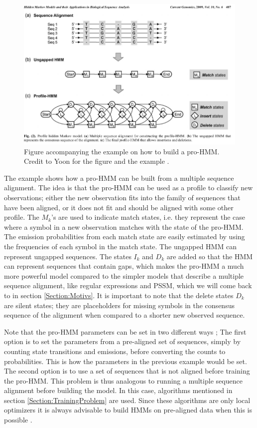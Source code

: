 \documentclass{article}\usepackage[]{graphicx}\usepackage[]{color}
\begin{document}
\begin{figure}[h]
    \centering
    \includegraphics[width = \textwidth]{exampleProfileHMM.png}
    \caption{Figure accompanying the example on how to build a pro-HMM. Credit to Yoon for the figure and the example \cite{Yoon2009}.}
    \label{fig:Yoon2009ProfileHMMExample}
\end{figure}

The example shows how a pro-HMM can be built from a multiple sequence alignment. The idea is that the pro-HMM can be used as a profile to classify new observations; either the new observation fits into the family of sequences that have been aligned, or it does not fit and should be aligned with some other profile. The $M_k$'s are used to indicate match states, i.e. they represent the case where a symbol in a new observation matches with the state of the pro-HMM. The emission probabilities from each match state are easily estimated by using the frequencies of each symbol in the match state. The ungapped HMM can represent ungapped sequences. The states $I_k$ and $D_k$ are added so that the HMM can represent sequences that contain gaps, which makes the pro-HMM a much more powerful model compared to the simpler models that describe a multiple sequence alignment, like regular expressions and PSSM, which we will come back to in section \ref{Section:Motivs}. It is important to note that the delete states $D_k$ are silent states; they are placeholders for missing symbols in the consensus sequence of the alignment when compared to a shorter new observed sequence. 

Note that the pro-HMM parameters can be set in two different ways \cite{Eddy1998}; The first option is to set the parameters from a pre-aligned set of sequences, simply by counting state transitions and emissions, before converting the counts to probabilities. This is how the parameters in the previous example would be set. The second option is to use a set of sequences that is not aligned before training the pro-HMM. This problem is thus analogous to running a multiple sequence alignment before building the model. In this case, algorithms mentioned in section \ref{Section:TrainingProblem} are used. Since these algorithms are only local optimizers it is always advisable to build HMMs on pre-aligned data when this is possible \cite{Eddy1998}. 
\end{document}
